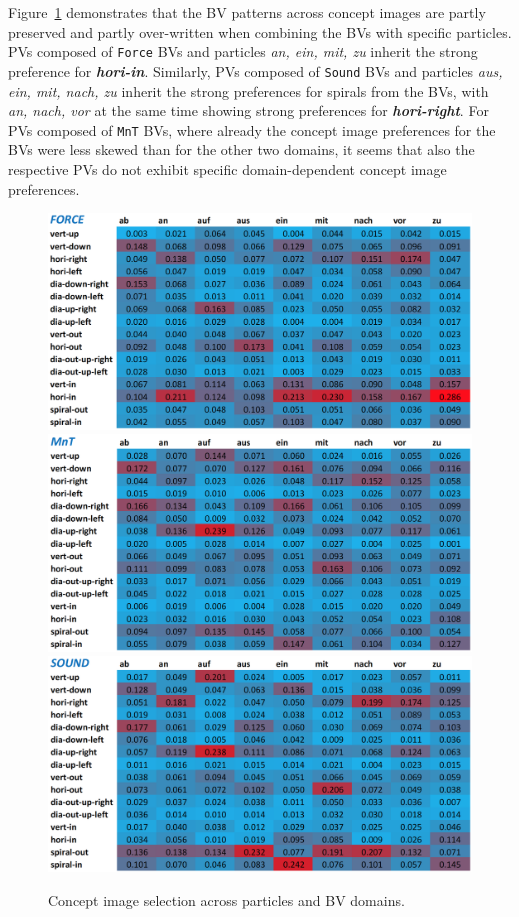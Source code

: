 \documentclass[output=paper]{langsci/langscibook}
\newcommand{\textci}[1]{\textit{\textbf{#1}}}
\begin{document}
Figure~\ref{fig:particle-prop-domain} demonstrates that the BV
patterns across concept images are partly preserved and partly
over-written when combining the BVs with specific particles. PVs
composed of \texttt{Force} BVs and particles \textit{an, ein, mit, zu}
inherit the strong preference for \textci{hori-in}. Similarly, PVs
composed of \texttt{Sound} BVs and particles \textit{aus, ein, mit,
  nach, zu} inherit the strong preferences for spirals from the BVs,
with \textit{an, nach, vor} at the same time showing strong
preferences for \textci{hori-right}. For PVs composed of \texttt{MnT}
BVs, where already the concept image preferences for the BVs were less
skewed than for the other two domains, it seems that also the
respective PVs do not exhibit specific domain-dependent concept image
preferences.

\begin{figure}[htbp]
  \caption{Concept image selection across particles and BV domains.}
  \label{fig:particle-prop-domain}
  \includegraphics[width=0.9\linewidth]{figures/dataset_particles_domains_force}
  \vspace{+2mm}\\
  \includegraphics[width=0.9\linewidth]{figures/dataset_particles_domains_mnt}
  \vspace{+2mm}\\
  \includegraphics[width=0.9\linewidth]{figures/dataset_particles_domains_sound}
\end{figure}
\end{document}
